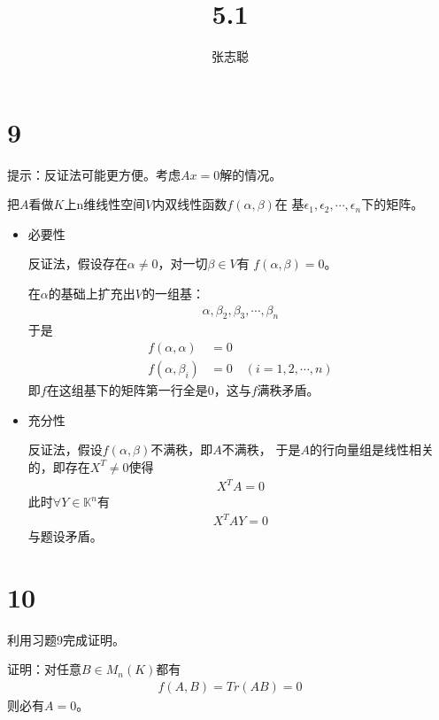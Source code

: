 \documentclass{article}
\begin{document}
\title{5.1}
\author{张志聪}
\maketitle

\section*{9}

提示：反证法可能更方便。考虑$Ax = 0$解的情况。

把$A$看做$K$上n维线性空间$V$内双线性函数$f(\alpha, \beta)$在
基$\epsilon_1, \epsilon_2, \cdots, \epsilon_n$下的矩阵。

\begin{itemize}
  \item 必要性

        反证法，假设存在$\alpha \neq 0$，对一切$\beta \in V$有
        $f(\alpha, \beta) = 0$。

        在$\alpha$的基础上扩充出$V$的一组基：
        \begin{align*}
          \alpha, \beta_2, \beta_3, \cdots, \beta_{n}
        \end{align*}
        于是
        \begin{align*}
          f(\alpha, \alpha)  & = 0                             \\
          f(\alpha, \beta_i) & = 0 \quad (i = 1, 2, \cdots, n)
        \end{align*}
        即$f$在这组基下的矩阵第一行全是0，这与$f$满秩矛盾。

  \item 充分性

        反证法，假设$f(\alpha, \beta)$不满秩，即$A$不满秩，
        于是$A$的行向量组是线性相关的，即存在$X^T \neq 0$使得
        \begin{align*}
          X^T A = 0
        \end{align*}
        此时$\forall Y \in \mathbb{K}^n$有
        \begin{align*}
          X^T A Y = 0
        \end{align*}
        与题设矛盾。
\end{itemize}

\section*{10}

利用习题9完成证明。

证明：对任意$B \in M_n(K)$都有
\begin{align*}
  f(A, B) = Tr(AB) = 0
\end{align*}
则必有$A = 0$。
\end{document}
